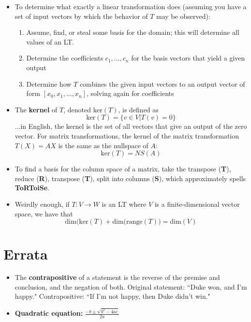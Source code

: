 \documentclass[10pt,letterpaper]{article}
\begin{document}
\begin{itemize}
\item To determine what exactly a linear transformation does (assuming you have a set of input vectors by which the behavior of $T$ may be observed): 
\begin{enumerate} 
\item Assume, find, or steal some basis for the domain; this will determine all values of an LT. 
\item Determine the coefficients $c_1, ...,c_n$ for the basis vectors that yield a given output 
\item Determine how $T$ combines the given input vectors to an output vector of form  $[x_0,x_1,...,x_n]$, solving again for coefficients
\end{enumerate}

\item The \textbf{kernel} of $T$, denoted $\mbox{ker}(T)$, is defined as 
$$\mbox{ker}(T)=\{ v\in V | T(v)=0\}$$ 
...in English, the kernel is the set of all vectors that give an output of the zero vector. For matrix transformations, the kernel of the matrix transformation $T(X)=AX$ is the same as the nullspace of $A$: 
$$\mbox{ker}(T)=NS(A)$$ %

\item To find a basis for the column space of a matrix, take the transpose (\textbf{T}), reduce (\textbf{R}), transpose (\textbf{T}), split into columns (\textbf{S}), which approximately spells \textbf{ToRToiSe}.

\item Weirdly enough, if $T : V \to W$ is an LT where $V$ is a finite-dimensional vector space, we have that 
$$\mbox{dim(ker}(T)+\mbox{dim(range}(T)) = \mbox{dim}(V)$$

\end{itemize}




\section*{Errata} 

\begin{itemize}
\item The \textbf{contrapositive }of a statement is the reverse of the premise and conclusion, and the negation of both. Original statement: ``Duke won, and I'm happy." Contrapositive: ``If I'm not happy, then Duke didn't win."
\item \textbf{Quadratic equation:} $\frac{-b\pm \sqrt{b^2-4ac}}{2a}$ 
\end{itemize}
\end{document}
